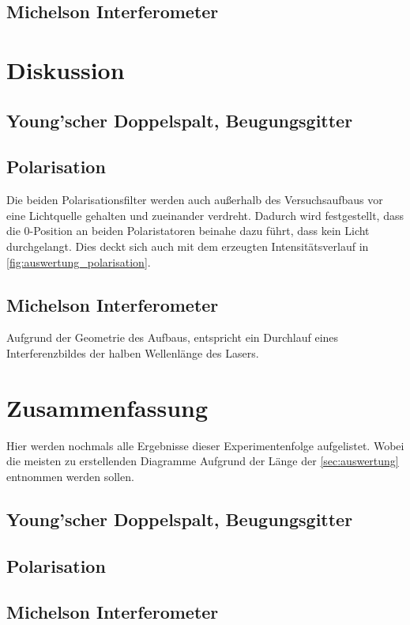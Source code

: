 \documentclass[12pt,english,ngerman]{scrartcl}
\begin{document}


\subsection{Michelson Interferometer}

\section{Diskussion}\label{sec:diskussion}

\subsection{Young'scher Doppelspalt, Beugungsgitter}


\subsection{Polarisation}

Die beiden Polarisationsfilter werden auch außerhalb des Versuchsaufbaus vor eine Lichtquelle gehalten und 
zueinander verdreht. Dadurch wird festgestellt, dass die 0-Position an beiden Polaristatoren beinahe dazu führt, dass 
kein Licht durchgelangt. Dies deckt sich auch mit dem erzeugten Intensitätsverlauf in \autoref{fig:auswertung_polarisation}.

\subsection{Michelson Interferometer}

Aufgrund der Geometrie des Aufbaus, entspricht ein Durchlauf eines Interferenzbildes der halben Wellenlänge des Lasers.
\section{Zusammenfassung}\label{sec:zusammenfassung}

Hier werden nochmals alle Ergebnisse dieser Experimentenfolge aufgelistet.
Wobei die meisten zu erstellenden Diagramme Aufgrund der Länge der
\autoref{sec:auswertung} entnommen werden sollen.

\subsection{Young'scher Doppelspalt, Beugungsgitter}


\subsection{Polarisation}


\subsection{Michelson Interferometer}


\newpage
\printbibliography
\listoffigures
\listoftables
\end{document}
